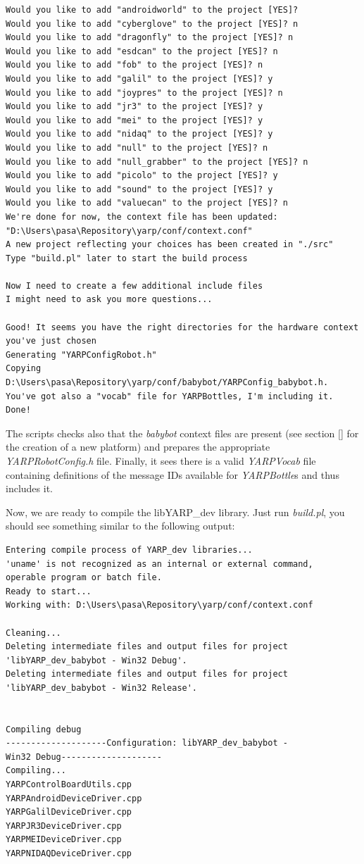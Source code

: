 \begin{verbatim}
Would you like to add "androidworld" to the project [YES]?
Would you like to add "cyberglove" to the project [YES]? n
Would you like to add "dragonfly" to the project [YES]? n
Would you like to add "esdcan" to the project [YES]? n
Would you like to add "fob" to the project [YES]? n
Would you like to add "galil" to the project [YES]? y
Would you like to add "joypres" to the project [YES]? n
Would you like to add "jr3" to the project [YES]? y
Would you like to add "mei" to the project [YES]? y
Would you like to add "nidaq" to the project [YES]? y
Would you like to add "null" to the project [YES]? n
Would you like to add "null_grabber" to the project [YES]? n
Would you like to add "picolo" to the project [YES]? y
Would you like to add "sound" to the project [YES]? y
Would you like to add "valuecan" to the project [YES]? n
We're done for now, the context file has been updated: 
"D:\Users\pasa\Repository\yarp/conf/context.conf"
A new project reflecting your choices has been created in "./src"
Type "build.pl" later to start the build process

Now I need to create a few additional include files
I might need to ask you more questions...

Good! It seems you have the right directories for the hardware context 
you've just chosen
Generating "YARPConfigRobot.h"
Copying D:\Users\pasa\Repository\yarp/conf/babybot/YARPConfig_babybot.h.
You've got also a "vocab" file for YARPBottles, I'm including it.
Done!
\end{verbatim}

The scripts checks also that the {\em babybot} context files are present (see section \ref{} for the creation of a new platform) and prepares the appropriate {\em YARPRobotConfig.h} file. Finally, it sees there is a valid {\em YARPVocab} file containing definitions of the message IDs available for {\em YARPBottle}s and thus includes it.

Now, we are ready to compile the libYARP\_dev library. Just run {\em build.pl}, you should see something similar to the following output:

\begin{verbatim}
Entering compile process of YARP_dev libraries...
'uname' is not recognized as an internal or external command,
operable program or batch file.
Ready to start...
Working with: D:\Users\pasa\Repository\yarp/conf/context.conf

Cleaning...
Deleting intermediate files and output files for project 
'libYARP_dev_babybot - Win32 Debug'.
Deleting intermediate files and output files for project 
'libYARP_dev_babybot - Win32 Release'.


Compiling debug
--------------------Configuration: libYARP_dev_babybot - 
Win32 Debug--------------------
Compiling...
YARPControlBoardUtils.cpp
YARPAndroidDeviceDriver.cpp
YARPGalilDeviceDriver.cpp
YARPJR3DeviceDriver.cpp
YARPMEIDeviceDriver.cpp
YARPNIDAQDeviceDriver.cpp
\end{verbatim}


